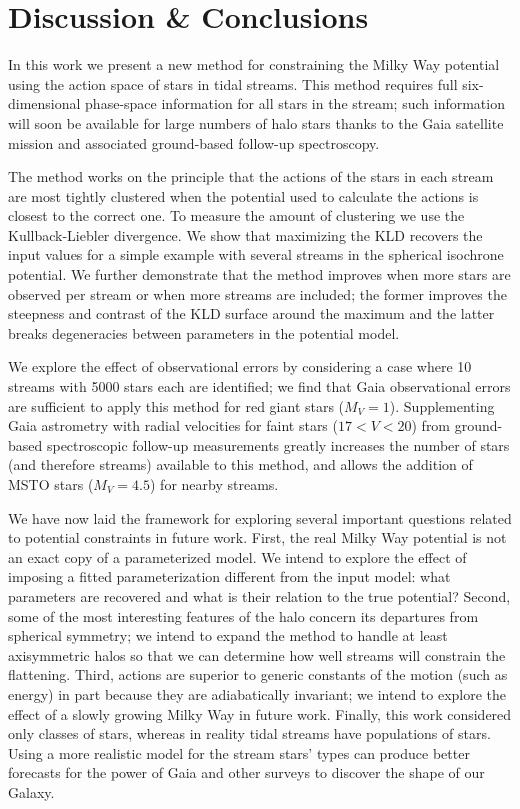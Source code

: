 \documentclass[useAMS,usenatbib,a4paper]{mn2e}
\begin{document}
\section{Discussion \& Conclusions}

In this work we present a new method for constraining the Milky Way potential using the action space of stars in tidal streams. This method requires full six-dimensional phase-space information for all stars in the stream; such information will soon be available for large numbers of halo stars thanks to the Gaia satellite mission and associated ground-based follow-up spectroscopy. 

The method works on the principle that the actions of the stars in each stream are most tightly clustered when the potential used to calculate the actions is closest to the correct one. To measure the amount of clustering we use the Kullback-Liebler divergence. We show that maximizing the KLD recovers the input values for a simple example with several streams in the spherical isochrone potential. We further demonstrate that the method improves when more stars are observed per stream or when more streams are included; the former improves the steepness and contrast of the KLD surface around the maximum and the latter breaks degeneracies between parameters in the potential model. 

We explore the effect of observational errors by considering a case where 10 streams with 5000 stars each are identified; we find that Gaia observational errors are sufficient to apply this method for red giant stars ($M_V=1$). Supplementing Gaia astrometry with radial velocities for faint stars ($17<V<20$) from ground-based spectroscopic follow-up measurements greatly increases the number of stars (and therefore streams) available to this method, and allows the addition of MSTO stars ($M_V=4.5$) for nearby streams.


We have now laid the framework for exploring several important questions related to potential constraints in future work. First, the real Milky Way potential is not an exact copy of a parameterized model. We intend to explore the effect of imposing a fitted parameterization different from the input model: what parameters are recovered and what is their relation to the true potential? Second, some of the most interesting features of the halo concern its departures from spherical symmetry; we intend to expand the method to handle at least axisymmetric halos so that we can determine how well streams will constrain the flattening. Third, actions are superior to generic constants of the motion (such as energy) in part because they are adiabatically invariant; we intend to explore the effect of a slowly growing Milky Way in future work. Finally, this work considered only classes of stars, whereas in reality tidal streams have populations of stars. Using a more realistic model for the stream stars' types can produce better forecasts for the power of Gaia and other surveys to discover the shape of our Galaxy.
\end{document}
